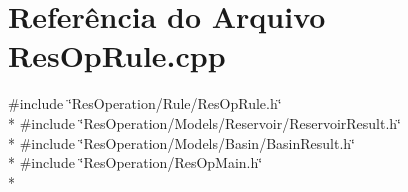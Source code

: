 \section{Referência do Arquivo Res\+Op\+Rule.\+cpp}
\label{_rule_2_res_op_rule_8cpp}
{\ttfamily \#include \char`\"{}Res\+Operation/\+Rule/\+Res\+Op\+Rule.\+h\char`\"{}}\\*
{\ttfamily \#include \char`\"{}Res\+Operation/\+Models/\+Reservoir/\+Reservoir\+Result.\+h\char`\"{}}\\*
{\ttfamily \#include \char`\"{}Res\+Operation/\+Models/\+Basin/\+Basin\+Result.\+h\char`\"{}}\\*
{\ttfamily \#include \char`\"{}Res\+Operation/\+Res\+Op\+Main.\+h\char`\"{}}\\*

